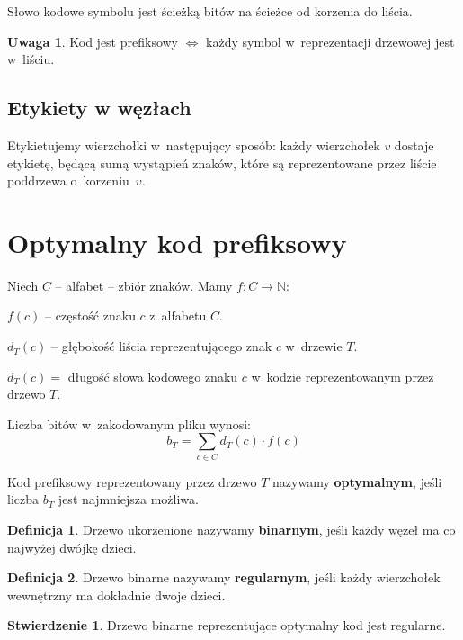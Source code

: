 \documentclass[a4paper,11pt]{article}
\theoremstyle{definition}
\newtheorem{definition}{Definicja}
\newtheorem{remark}{Uwaga}
\newtheorem{proposition}{Stwierdzenie}
\begin{document}
Słowo kodowe symbolu jest ścieżką bitów na ścieżce od korzenia do liścia.

\begin{remark}
Kod jest prefiksowy $\iff$ każdy symbol w~reprezentacji drzewowej jest w~liściu.
\end{remark}

\subsection{Etykiety w węzłach}

Etykietujemy wierzchołki w~następujący sposób: każdy wierzchołek $v$ dostaje etykietę, będącą sumą wystąpień znaków, które są reprezentowane przez liście poddrzewa o~korzeniu~$v$.

\section{Optymalny kod prefiksowy}

Niech $C$ -- alfabet -- zbiór znaków. Mamy $f \colon C \to \mathbb{N}$:

$f(c)$ -- częstość znaku $c$ z~alfabetu $C$.

$d_T(c)$ -- głębokość liścia reprezentującego znak $c$ w~drzewie $T$.

$d_T(c) = $ długość słowa kodowego znaku $c$ w~kodzie reprezentowanym przez drzewo $T$.

Liczba bitów w~zakodowanym pliku wynosi:
\[
    b_T = \sum_{c \in C} d_T(c) \cdot f(c)
\]

Kod prefiksowy reprezentowany przez drzewo $T$ nazywamy \textbf{optymalnym}, jeśli liczba $b_T$ jest najmniejsza możliwa.

\begin{definition}
Drzewo ukorzenione nazywamy \textbf{binarnym}, jeśli każdy węzeł ma co najwyżej dwójkę dzieci.
\end{definition}

\begin{definition}
Drzewo binarne nazywamy \textbf{regularnym}, jeśli każdy wierzchołek wewnętrzny ma dokładnie dwoje dzieci.
\end{definition}

\begin{proposition}
Drzewo binarne reprezentujące optymalny kod jest regularne.
\end{proposition}
\end{document}
